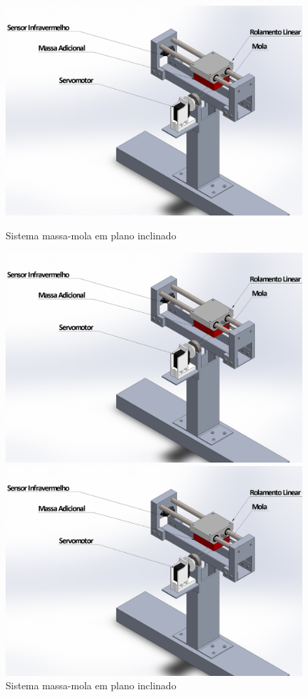\documentclass{relatorio}
\begin{document}
	\begin{figure}[H]
		\centering
		\captionsetup{justification=centering}
		\includegraphics[width=0.8\linewidth]{imgs/planta}
		\caption{Sistema massa-mola em plano inclinado}%
		\label{fig:plant}
		\centering
		\captionsetup{justification=centering}
		\includegraphics[width=0.8\linewidth]{imgs/planta}
		\caption{Sistema massa-mola em plano inclinado}%
		\label{fig:plant}
		\centering
		\captionsetup{justification=centering}
		\includegraphics[width=0.8\linewidth]{imgs/planta}

\end{figure}
\end{document}
